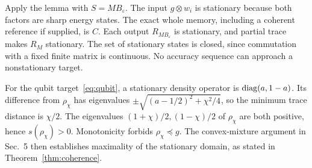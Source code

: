 Apply the lemma with $S=MB_\varepsilon$. The input $g\otimes w_i$ is stationary because both factors are sharp energy states. The exact whole memory, including a coherent reference if supplied, is $C$. Each output $R_{MB_\varepsilon}$ is stationary, and partial trace makes $R_M$ stationary. The set of stationary states is closed, since commutation with a fixed finite matrix is continuous. No accuracy sequence can approach a nonstationary target.

For the qubit target~\eqref{eq:qubit}, a stationary density operator is $\operatorname{diag}(a,1-a)$. Its difference from $\rho_\chi$ has eigenvalues $\pm\sqrt{(a-1/2)^2+\chi^2/4}$, so the minimum trace distance is $\chi/2$. The eigenvalues $(1+\chi)/2,(1-\chi)/2$ of $\rho_\chi$ are both positive, hence $s(\rho_\chi)>0$. Monotonicity forbids $\rho_\chi\preceq g$. The convex-mixture argument in Sec.~5 then establishes maximality of the stationary domain, as stated in Theorem~\ref{thm:coherence}.
